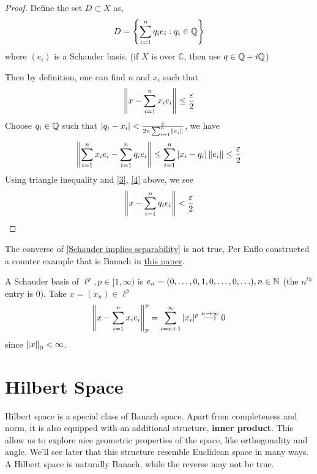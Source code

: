 \documentclass{article}
\begin{document}
\begin{proof}
    Define the set $D \subset X$ as,  
    $$
    D = \left\{\sum_{i=1}^n q_i e_i: q_i \in \mathbb{Q} \right\}
    $$  
    where $(e_i)$ is a Schauder basis. (if $X$ is over $\mathbb{C}$, then use $q \in \mathbb{Q} + i \mathbb{Q}$)
    
    Then by definition, one can find $n$ and $x_i$ such that  
    \begin{equation}
        \label{3}
        \left\|{x - \sum_{i=1}^n x_i e_i}\right\| \leq \frac{\varepsilon}{2}  
    \end{equation}
    Choose $q_i \in \mathbb{Q}$ such that $|q_i - x_i|<\frac{\varepsilon}{2n \sum_{i=1}^n \left\|{e_i}\right\|}$, we have  
    \begin{equation}
    \label{4}
        \left\|{\sum_{i=1}^n x_i e_i - \sum_{i=1}^n q_i e_i}\right\| \leq \sum_{i=1}^n |x_i-q_i| \left\|{e_i}\right\| \leq \frac{\varepsilon}{2}
    \end{equation}
    Using triangle inequality and \cref{3}, \cref{4} above, we see
    $$
    \left\|{x-\sum_{i=1}^n q_i e_i}\right\| < \frac{\varepsilon}{2}
    $$
\end{proof}

\begin{remark}
    The converse of \cref{Schauder implies separability} is not true, Per Enflo constructed a counter example that is Banach in \href{https://projecteuclid.org/download/pdf_1/euclid.acta/1485889774}{this paper}.
\end{remark}

\begin{example}
    A Schauder basis of $\ell^p, p\in [1, \infty)$ is $e_n=(0,\ldots, 0,1,0, \ldots,0,\ldots), n\in \mathbb{N}$ (the $n^{th}$ entry is $0$).  
    Take $x=(x_n)\in \ell^p$  
    $$
    \left\|{x-\sum_{i=1}^n x_ie_i}\right\|_p^p = \sum_{i=n+1}^{\infty} |x_i|^p \overset{n\to \infty}{\longrightarrow} 0
    $$  
    since $\left\|{x}\right\|_0 < \infty$.  
\end{example}


\newpage
\section{Hilbert Space}  

\begin{unexaminable}
Hilbert space is a special class of Banach space. 
Apart from completeness and norm, it is also equipped with an additional structure, 
{\bf inner product}. This allow us to explore nice geometric properties of the space, 
like orthogonality and angle. We'll see later that this structure resemble Euclidean space in many ways. A Hilbert space is naturally Banach, while the reverse may not be true.
\end{unexaminable}
\end{document}
